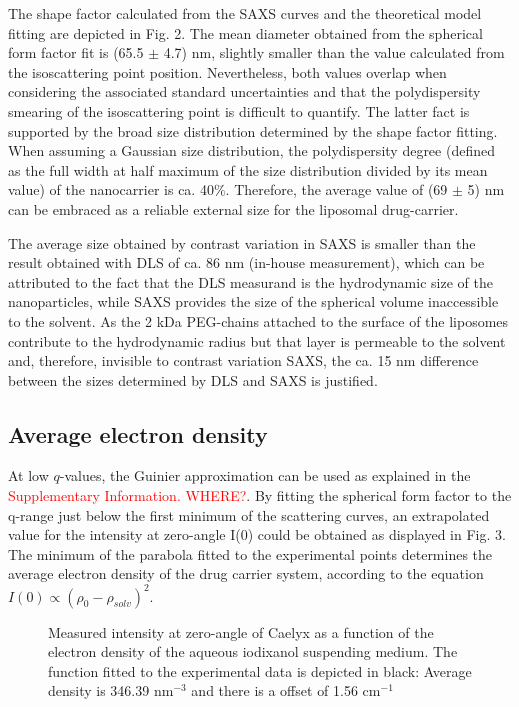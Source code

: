 The shape factor calculated from the SAXS curves and the theoretical model fitting are depicted in Fig. 2. The mean diameter obtained from the spherical form factor fit is (65.5 $\pm$ 4.7) nm, slightly smaller than the value calculated from the isoscattering point position. Nevertheless, both values overlap when considering the associated standard uncertainties and that the polydispersity smearing of the isoscattering point is difficult to quantify. The latter fact is supported by the broad size distribution determined by the shape factor fitting. When assuming a Gaussian size distribution, the polydispersity degree (defined as the full width at half maximum of the size distribution divided by its mean value) of the nanocarrier is ca. 40$\%$. Therefore, the average value of (69 $\pm$ 5) nm can be embraced as a reliable external size for the liposomal drug-carrier.

The average size obtained by contrast variation in SAXS is smaller than the result obtained with DLS of ca. 86 nm (in-house measurement), which can be attributed to the fact that the DLS measurand is the hydrodynamic size of the nanoparticles, while SAXS provides the size of the spherical volume inaccessible to the solvent. As the 2 kDa PEG-chains attached to the surface of the liposomes contribute to the hydrodynamic radius but that layer is permeable to the solvent and, therefore, invisible to contrast variation SAXS, the ca. 15 nm difference between the sizes determined by DLS and SAXS is justified. 

\subsection{Average electron density}
At low $q$-values, the Guinier approximation can be used as explained in the \textcolor{red}{Supplementary Information.  WHERE?}. By fitting the spherical form factor to the q-range just below the first minimum of the scattering curves, an extrapolated value for the intensity at zero-angle I(0) could be obtained as displayed in Fig. 3. The minimum of the parabola fitted to the experimental points determines the average electron density of the drug carrier system, according to the equation $I(0) \propto (\rho_0-\rho_{solv})^2$.

\begin{figure}
	\centering
		
		\caption{Measured intensity at zero-angle of Caelyx as a function of the electron density of the aqueous iodixanol suspending medium. The function fitted to the experimental data is depicted in black: Average density is 346.39 nm$^{-3}$ and there is a offset of 1.56 cm$^{-1}$}
		\label{fig:CaelyxAverageDensity}
\end{figure}


